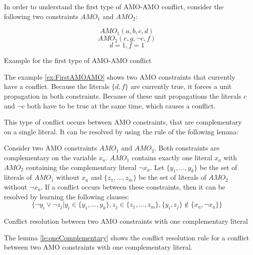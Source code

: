 In order to understand the first type of AMO-AMO conflict, consider the following two constraints $AMO_1$ and $AMO_2$:

\begin{example}
\begin{leftbar}
\begin{displaymath}
AMO_1(a,b,c,d)
\end{displaymath}
\begin{displaymath}
AMO_2(e,g,\neg c,f)
\end{displaymath}
\begin{displaymath}
d = 1, f = 1
\end{displaymath}
\end{leftbar}
\caption{Example for the first type of AMO-AMO conflict}
\label{ex:FirstAMOAMO}
\end{example}

The example \ref{ex:FirstAMOAMO} shows two AMO constraints that currently have a conflict. Because the literals $\{d,f\}$ are currently true, it forces a unit propagation in both constraints. Because of these unit propagations the literals $c$ and $\neg c$ both have to be true at the same time, which causes a conflict.

This type of conflict occurs between AMO constraints, that are complementary on a single literal. It can be resolved by using the rule of the following lemma:

\begin{lemma}
\begin{leftbar}
Consider two AMO constraints $AMO_1$ and $AMO_2$. Both constraints are complementary on the variable $x_a$. $AMO_1$ contains exactly one literal $x_a$ with $AMO_2$ containing the complementary literal $\neg x_a$. Let $\{y_1,...,y_k\}$ be the set of literals of $AMO_1$ without $x_a$ and $\{z_1,...,z_m\}$ be the set of literals of $AMO_2$ without $\neg x_a$. 
If a conflict occurs between these constraints, then it can be resolved by learning the following clauses:
\begin{displaymath}
\{\neg y_i \vee \neg z_j | y_i \in \{y_1,...,y_k\}, z_j \in \{z_1,...,z_m\}, \{y_i,z_j\} \not\in \{x_a, \neg x_a\}\}
\end{displaymath}
\end{leftbar}
\caption{Conflict resolution between two AMO constraints with one complementary literal}
\label{le:oneComplementary}
\end{lemma}

The lemma \ref{le:oneComplementary} shows the conflict resolution rule for a conflict between two AMO constraints with one complementary literal. 

